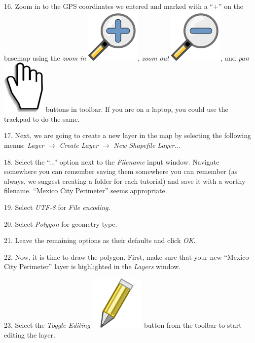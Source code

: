 \documentclass[oneside,a4paper,11pt,explicit]{book}
\begin{document}
16. Zoom in to the GPS coordinates we entered and marked with a ``$+$'' on the basemap using the \textit{zoom in} \includegraphics[height=\fontcharht\font`\B]{mActionZoomIn.png}, \textit{zoom out} \includegraphics[height=\fontcharht\font`\B]{mActionZoomOut.png}, and \textit{pan} \includegraphics[height=\fontcharht\font`\B]{mActionPan.png} buttons in toolbar. If you are on a laptop, you could use the trackpad to do the same.

17. Next, we are going to create a new layer in the map by selecting the following menus: \textit{Layer} $\rightarrow$ \textit{Create Layer} $\rightarrow$ \textit{New Shapefile Layer...}

18. Select the ``...'' option next to the \textit{Filename} input window. Navigate somewhere you can remember saving them somewhere you can remember (as always, we suggest creating a folder for each tutorial) and save it with a worthy filename. ``Mexico City Perimeter'' seems appropriate.

19. Select \textit{UTF-8} for \textit{File encoding}.

20. Select \textit{Polygon} for geometry type. 

21. Leave the remaining options as their defaults and click \textit{OK}.

22. Now, it is time to draw the polygon. First, make sure that your new ``Mexico City Perimeter'' layer is highlighted in the \textit{Layers} window. 

23. Select the \textit{Toggle Editing} \includegraphics[height=\fontcharht\font`\B]{mActionToggleEditing.png} button from the toolbar to start editing the layer. 
\end{document}
